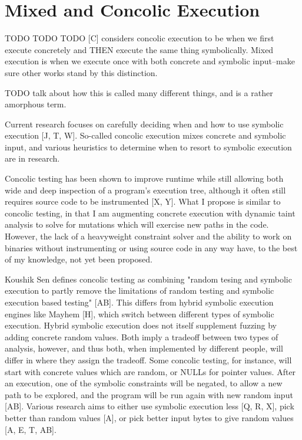 \documentclass[11pt,expanded,copyright]{fsuthesis}
\begin{document}
\section{Mixed and Concolic Execution}

TODO TODO TODO [C] considers concolic execution to be when we first execute concretely and THEN execute the same thing symbolically. Mixed execution is when we execute once with both concrete and symbolic input--make sure other works stand by this distinction.

TODO talk about how this is called many different things, and is a rather amorphous term.

Current research focuses on carefully deciding when and how to use symbolic execution [J, T, W]. So-called concolic execution mixes concrete and symbolic input, and various heuristics to determine when to resort to symbolic execution are in research.

Concolic testing has been shown to improve runtime while still allowing both wide and deep inspection of a program's execution tree, although it often still requires source code to be instrumented [X, Y]. What I propose is similar to concolic testing, in that I am augmenting concrete execution with dynamic taint analysis to solve for mutations which will exercise new paths in the code. However, the lack of a heavyweight constraint solver and the ability to work on binaries without instrumenting or using source code in any way have, to the best of my knowledge, not yet been proposed.

Koushik Sen defines concolic testing as combining "random tesing and symbolic execution to partly remove the limitations of random testing and symbolic execution based testing" [AB]. This differs from hybrid symbolic execution engines like Mayhem [H], which switch between different types of symbolic execution. Hybrid symbolic execution does not itself supplement fuzzing by adding concrete random values. Both imply a tradeoff between two types of analysis, however, and thus both, when implemented by different people, will differ in where they assign the tradeoff. Some concolic testing, for instance, will start with concrete values which are random, or NULLs for pointer values. After an execution, one of the symbolic constraints will be negated, to allow a new path to be explored, and the program will be run again with new random input [AB]. Various research aims to either use symbolic execution less [Q, R, X], pick better than random values [A], or pick better input bytes to give random values [A, E, T, AB].
\end{document}
